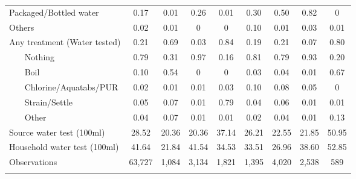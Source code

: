 \begin{table}[htbp]
\begin{tabular}{l*{8}{c}}
Packaged/Bottled water&        0.17&        0.01&        0.26&        0.01&        0.30&        0.50&        0.82&        0\\
Others              &        0.02&        0.01&        0&        0&        0.10&        0.01&        0.03&        0.01\\
Any treatment (Water tested)&        0.21&        0.69&        0.03&        0.84&        0.19&        0.21&        0.07&        0.80\\
~~~ Nothing      &        0.79&        0.31&        0.97&        0.16&        0.81&        0.79&        0.93&        0.20\\
~~~ Boil         &        0.10&        0.54&        0&        0&        0.03&        0.04&        0.01&        0.67\\
~~~ Chlorine/Aquatabs/PUR&        0.02&        0.01&        0.01&        0.03&        0.10&        0.08&        0.05&        0\\
~~~ Strain/Settle&        0.05&        0.07&        0.01&        0.79&        0.04&        0.06&        0.01&        0.01\\
~~~ Other        &        0.04&        0.07&        0.01&        0.01&        0.02&        0.04&        0.01&        0.13\\
Source water test (100ml)&       28.52&       20.36&       20.36&       37.14&       26.21&       22.55&       21.85&       50.95\\
Household water test (100ml)&       41.64&       21.84&       41.54&       34.53&       33.51&       26.96&       38.60&       52.85\\
\hline
Observations        &      63,727&       1,084&       3,134&       1,821&       1,395&       4,020&       2,538&         589\\
\hline\hline
\multicolumn{9}{p{0.87\linewidth}}{\footnotesize }\\
\end{tabular}
\end{table}
